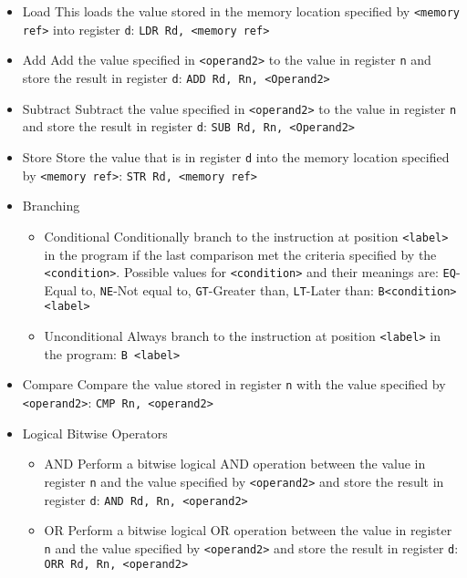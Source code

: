   \begin{itemize}
    \setlength{\itemsep}{0em}
    \item Load
      \subitem This loads the value stored in the memory location specified by \verb|<memory ref>| into register \verb|d|: \verb|LDR Rd, <memory ref>|
    \item Add
      \subitem Add the value specified in \verb|<operand2>| to the value in register \verb|n| and store the result in register \verb|d|: \verb|ADD Rd, Rn, <Operand2>|
    \item Subtract
      \subitem Subtract the value specified in \verb|<operand2>| to the value in register \verb|n| and store the result in register \verb|d|: \verb|SUB Rd, Rn, <Operand2>|
    \item Store
      \subitem Store the value that is in register \verb|d| into the memory location specified by \verb|<memory ref>|: \verb|STR Rd, <memory ref>|
    \item Branching
    \begin{itemize}
      \setlength{\itemsep}{0em}
      \item Conditional
        \subitem Conditionally branch to the instruction at position \verb|<label>| in the program if the last comparison met the criteria specified by the \verb|<condition>|. Possible values for \verb|<condition>| and their meanings are: \verb|EQ|-Equal to, \verb|NE|-Not equal to, \verb|GT|-Greater than, \verb|LT|-Later than: \verb|B<condition> <label>|
      \item Unconditional
        \subitem Always branch to the instruction at position \verb|<label>| in the program: \verb|B <label>|
    \end{itemize}
    \item Compare
      \subitem Compare the value stored in register \verb|n| with the value specified by \verb|<operand2>|: \verb|CMP Rn, <operand2>|
    \item Logical Bitwise Operators
    \begin{itemize}
      \setlength{\itemsep}{0em}
      \item AND
        \subitem Perform a bitwise logical AND operation between the value in register \verb|n| and the value specified by \verb|<operand2>| and store the result in register \verb|d|: \verb|AND Rd, Rn, <operand2>|
      \item OR
        \subitem Perform a bitwise logical OR operation between the value in register \verb|n| and the value specified by \verb|<operand2>| and store the result in register \verb|d|: \verb|ORR Rd, Rn, <operand2>|

\end{itemize}
\end{itemize}
